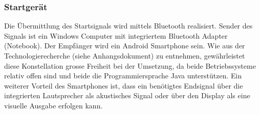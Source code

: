 \subsubsection{Startgerät}
Die Übermittlung des Startsignals wird mittels Bluetooth realisiert. 
Sender des Signals ist ein Windows Computer mit integriertem Bluetooth Adapter (Notebook). Der Empfänger wird ein Android Smartphone sein.
Wie aus der Technologierecherche (siehe Anhangsdokument) zu entnehmen, gewährleistet diese Konstellation grosse Freiheit bei der Umsetzung, 
da beide Betriebssysteme relativ offen sind und beide die Programmiersprache Java unterstützen.
Ein weiterer Vorteil des Smartphones ist, dass ein benötigtes Endsignal über die integrierten Lautsprecher 
als akustisches Signal oder über den Display als eine visuelle Ausgabe erfolgen kann.
